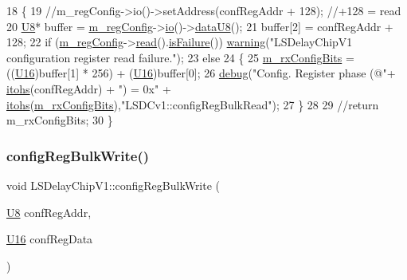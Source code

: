 \begin{DoxyCode}
18 \{
19     \textcolor{comment}{//m\_regConfig->io()->setAddress(confRegAddr + 128);     //+128 = read   }
20     \hyperlink{ICECALv3_8h_a3cb25ca6f51f003950f9625ff05536fc}{U8}* buffer = \hyperlink{classLSDelayChipV1_afd1cfdcb114549dc1466c77f07d39fe0}{m\_regConfig}->\hyperlink{classIOobject_af04fb94137c3d86849f478ac5afab5d1}{io}()->\hyperlink{classIOdata_a75e9c318dbac3a39402179070943d4bc}{dataU8}();
21     buffer[2] = confRegAddr + 128;
22     \textcolor{keywordflow}{if} (\hyperlink{classLSDelayChipV1_afd1cfdcb114549dc1466c77f07d39fe0}{m\_regConfig}->\hyperlink{classIOobject_aa07610c11963b1db6710e3c76ceea456}{read}().\hyperlink{classStatusCode_a5dd22dc6eb2c52fc4cabc58f6dea2eb7}{isFailure}())  \hyperlink{classObject_a65cd4fda577711660821fd2cd5a3b4c9}{warning}(\textcolor{stringliteral}{"LSDelayChipV1
       configuration register read failure."});
23     \textcolor{keywordflow}{else}
24     \{
25         \hyperlink{classLSDelayChipV1_ae049797212539b231b9722ae69a0491d}{m\_rxConfigBits} = ((\hyperlink{ICECALv3_8h_adf928e51a60dba0df29d615401cc55a8}{U16})buffer[1] * 256) + (\hyperlink{ICECALv3_8h_adf928e51a60dba0df29d615401cc55a8}{U16})buffer[0];
26         \hyperlink{classObject_aac010553f022165573714b7014a15f0d}{debug}(\textcolor{stringliteral}{"Config. Register phase (@"}+ \hyperlink{classLSDelayChipV1_af7f4d72fb404b6b3d7b41fd01876ed0a}{itohs}(confRegAddr) + \textcolor{stringliteral}{") = 0x"} + 
      \hyperlink{classLSDelayChipV1_af7f4d72fb404b6b3d7b41fd01876ed0a}{itohs}(\hyperlink{classLSDelayChipV1_ae049797212539b231b9722ae69a0491d}{m\_rxConfigBits}),\textcolor{stringliteral}{"LSDCv1::configRegBulkRead"});
27     \}
28          
29     \textcolor{comment}{//return m\_rxConfigBits; }
30 \}
\end{DoxyCode}
\mbox{\label{classLSDelayChipV1_afa626b5d52f8723bcaa3205d1cc7a0f8}} 
\subsubsection{\texorpdfstring{config\+Reg\+Bulk\+Write()}{configRegBulkWrite()}}
{\footnotesize\ttfamily void L\+S\+Delay\+Chip\+V1\+::config\+Reg\+Bulk\+Write (\begin{DoxyParamCaption}\item[{\hyperlink{ICECALv3_8h_a3cb25ca6f51f003950f9625ff05536fc}{U8}}]{conf\+Reg\+Addr,  }\item[{\hyperlink{ICECALv3_8h_adf928e51a60dba0df29d615401cc55a8}{U16}}]{conf\+Reg\+Data }\end{DoxyParamCaption})}



